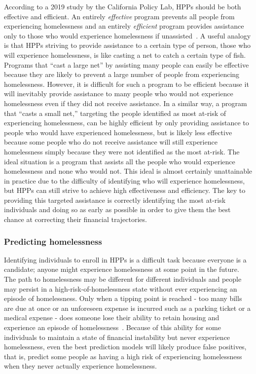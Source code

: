 \documentclass[10pt,letterpaper]{article}
\begin{document}
According to a 2019 study by the California Policy Lab, HPPs should be both effective and efficient. An entirely \textit{effective} program prevents all people from experiencing homelessness and an entirely \textit{efficient} program provides assistance only to those who would experience homelessness if unassisted~\cite{von2019predicting}. A useful analogy is that HPPs striving to provide assistance to a certain type of person, those who will experience homelessness, is like casting a net to catch a certain type of fish. Programs that ``cast a large net'' by assisting many people can easily be effective because they are likely to prevent a large number of people from experiencing homelessness. However, it is difficult for such a program to be efficient because it will inevitably provide assistance to many people who would not experience homelessness even if they did not receive assistance. In a similar way, a program that ``casts a small net,'' targeting the people identified as most at-risk of experiencing homelessness, can be highly efficient by only providing assistance to people who would have experienced homelessness, but is likely less effective because some people who do not receive assistance will still experience homelessness simply because they were not identified as the most at-risk. The ideal situation is a program that assists all the people who would experience homelessness and none who would not. This ideal is almost certainly unattainable in practice due to the difficulty of identifying who will experience homelessness, but HPPs can still strive to achieve high effectiveness and efficiency. The key to providing this targeted assistance is correctly identifying the most at-risk individuals and doing so as early as possible in order to give them the best chance at correcting their financial trajectories.

\subsubsection*{Predicting homelessness}
Identifying individuals to enroll in HPPs is a difficult task because everyone is a candidate; anyone might experience homelessness at some point in the future. The path to homelessness may be different for different individuals and people may persist in a high-risk-of-homelessness state without ever experiencing an episode of homelessness. Only when a tipping point is reached - too many bills are due at once or an unforeseen expense is incurred such as a parking ticket or a medical expense - does someone lose their ability to retain housing and experience an episode of homelessness~\cite{o2004wrong}. Because of this ability for some individuals to maintain a state of financial instability but never experience homelessness, even the best prediction models will likely produce false positives, that is, predict some people as having a high risk of experiencing homelessness when they never actually experience homelessness.
\end{document}
